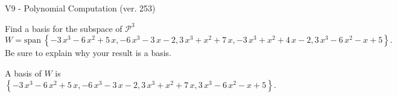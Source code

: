 \begin{exercise}
  \begin{exerciseTitle}V9 - Polynomial Computation (ver. 253)\end{exerciseTitle}
  \begin{exerciseStatement}
    Find a basis for the subspace of \(\mathcal{P}^3\) 
\[W=\mathrm{span}\ \left\{-3 \, x^{3} - 6 \, x^{2} + 5 \, x , -6 \, x^{3} - 3 \, x - 2 , 3 \, x^{3} + x^{2} + 7 \, x , -3 \, x^{3} + x^{2} + 4 \, x - 2 , 3 \, x^{3} - 6 \, x^{2} - x + 5\right\}.\]
 Be sure to explain why your result is a basis.


  \end{exerciseStatement}
  \begin{exerciseAnswer}
   A basis of \(W\) is  \(\left\{-3 \, x^{3} - 6 \, x^{2} + 5 \, x , -6 \, x^{3} - 3 \, x - 2 , 3 \, x^{3} + x^{2} + 7 \, x , 3 \, x^{3} - 6 \, x^{2} - x + 5\right\}\).
  


  \end{exerciseAnswer}
\end{exercise}